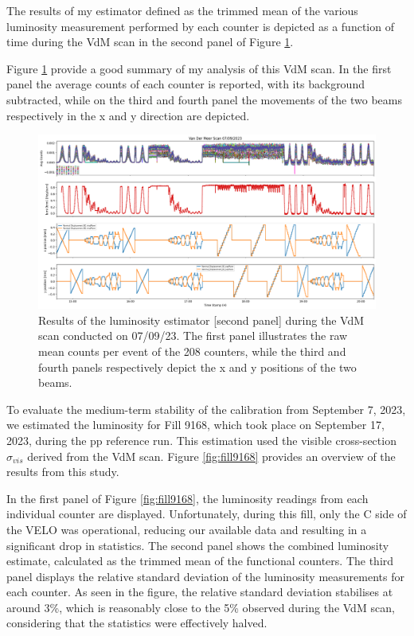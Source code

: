 The results of my estimator defined as the trimmed mean of the various luminosity measurement performed by each counter is depicted as a function of time during the VdM scan in the second panel of Figure \ref{fig:lumi_result_all}. 

Figure \ref{fig:lumi_result_all} provide a good summary of my analysis of this VdM scan. In the first panel the average counts of each counter is reported, with its background subtracted, while on the third and fourth panel the movements of the two beams respectively in the x and y direction are depicted.

\begin{figure}
    \centering
    \includegraphics[width=\textwidth]{figures/lumi_plot.png}
    \caption{Results of the luminosity estimator [second panel] during the VdM scan conducted on 07/09/23.
The first panel illustrates the raw mean counts per event of the 208 counters, while the third and fourth
panels respectively depict the x and y positions of the two beams.}
    \label{fig:lumi_result_all}
\end{figure}


To evaluate the medium-term stability of the calibration from September 7, 2023, we estimated the luminosity for Fill 9168, which took place on September 17, 2023, during the pp reference run. This estimation used the visible cross-section $\sigma_{vis}$ derived from the VdM scan. Figure \ref{fig:fill9168} provides an overview of the results from this study.

In the first panel of Figure \ref{fig:fill9168}, the luminosity readings from each individual counter are displayed. Unfortunately, during this fill, only the C side of the VELO was operational, reducing our available data and resulting in a significant drop in statistics. The second panel shows the combined luminosity estimate, calculated as the trimmed mean of the functional counters. The third panel displays the relative standard deviation of the luminosity measurements for each counter. As seen in the figure, the relative standard deviation stabilises at around 3\%, which is reasonably close to the 5\% observed during the VdM scan, considering that the statistics were effectively halved.

